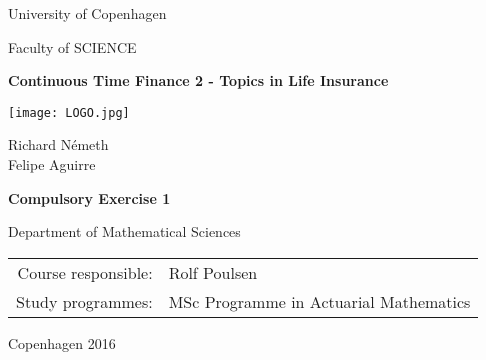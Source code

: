 \documentclass[a4paper]{article}
\begin{document}
\begin{center}


{\large University of Copenhagen}

\medskip
{\large Faculty of SCIENCE}

\vfill
{\bfseries\Large Continuous Time Finance 2 - Topics in Life Insurance}

\vfill
\centerline{\mbox{\texttt{[image: LOGO.jpg]}}}

\vfill
\vspace{5mm}

{\LARGE Richard Németh}\\
{\LARGE Felipe Aguirre}\\

\vspace{15mm}

{\LARGE\bfseries Compulsory Exercise 1}

\vfill

Department of Mathematical Sciences


\vfill

\begin{tabular}{rl}
Course responsible: & Rolf Poulsen \\   %
\noalign{\vspace{2mm}}
Study programmes: & MSc Programme in Actuarial Mathematics
\end{tabular}

\vfill

Copenhagen 2016
\newpage

\end{center}
\newpage
{}
\end{document}

